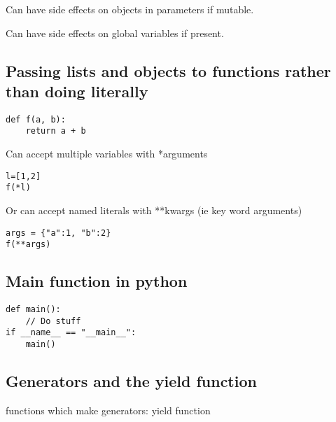 Can have side effects on objects in parameters if mutable.

Can have side effects on global variables if present.

\subsection{Passing lists and objects to functions rather than doing literally}

\begin{verbatim}
def f(a, b):
    return a + b
\end{verbatim}

Can accept multiple variables with *arguments

\begin{verbatim}
l=[1,2]
f(*l)
\end{verbatim}

Or can accept named literals with **kwargs (ie key word arguments)

\begin{verbatim}
args = {"a":1, "b":2}
f(**args)
\end{verbatim}

\subsection{Main function in python}

\begin{verbatim}
def main():
    // Do stuff
if __name__ == "__main__":
    main()
\end{verbatim}

\subsection{Generators and the yield function}

functions which make generators: yield function



